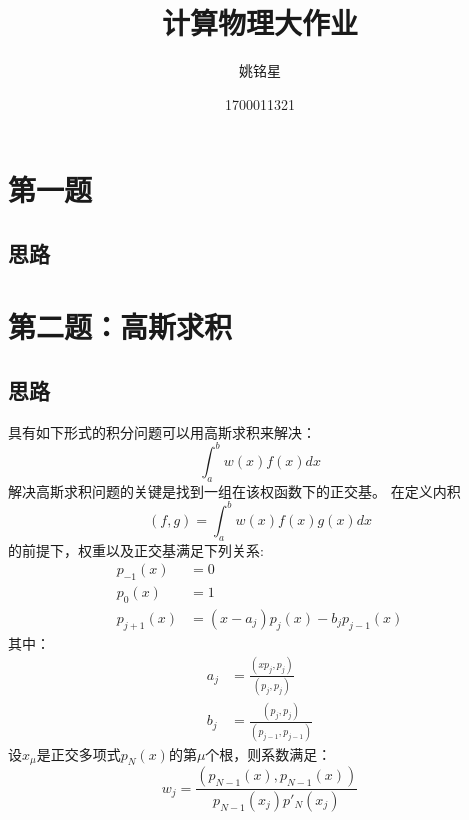 \documentclass{ctexart}
\title{计算物理大作业}
\author{姚铭星}
\date{1700011321}
\begin{document}
\maketitle
\thispagestyle{fancy}
\section{第一题}
\subsection{思路}
\section{第二题：高斯求积}
\subsection{思路}
具有如下形式的积分问题可以用高斯求积来解决：
$$\int_{a}^{b} w(x)f(x)dx$$
解决高斯求积问题的关键是找到一组在该权函数下的正交基。
在定义内积
\[ (f,g)=\int_{a}^{b} w(x)f(x)g(x)dx \]
的前提下，权重以及正交基满足下列关系:
\begin{align*}
p_{-1}(x)&=0\\
p_0 (x)&=1\\
p_{j+1}(x)&=(x-a_j)p_{j}(x)-b_jp_{j-1}(x)
\end{align*}
其中：
\begin{align*}
a_j&=\frac{(xp_j,p_j)}{(p_j,p_j)}\\
b_j&=\frac{(p_{j},p_{j})}{(p_{j-1},p_{j-1})}
\end{align*}
设$x_{\mu}$是正交多项式$p_N(x)$的第$\mu$个根，则系数满足：
\[w_j=\frac{(p_{N-1}(x),p_{N-1}(x))}{p_{N-1}(x_j)p'_{N}(x_j)}\]
\end{document}
